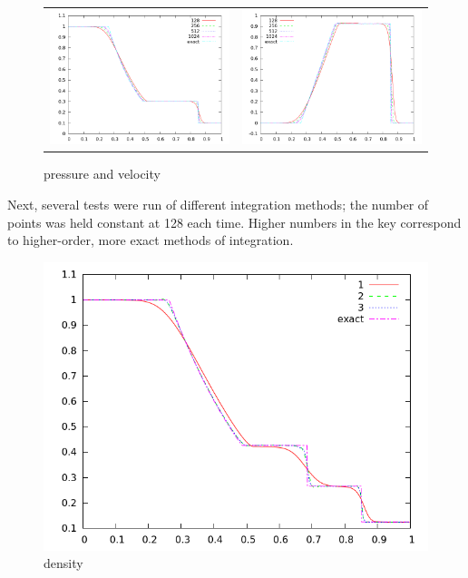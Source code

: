 \documentclass[letterpaper,12pt]{article}
\begin{document}
\begin{figure}
  \begin{center}
	\begin{tabular}{cc}
      \includegraphics[width=.425\textwidth]{prscellcomp_20} &
	  \includegraphics[width=.425\textwidth]{velcellcomp_20}
	\end{tabular}
  \end{center}
  \caption{pressure and velocity}
\end{figure}

    
Next, several tests were run of different integration methods; the number of points was held constant at 128 each time. Higher numbers in the key correspond to higher-order, more exact methods of integration. 

\begin{figure}[h]
  \begin{center}
    \includegraphics[width=.78\textwidth]{den128comp_20}
  \end{center}
  \caption{density}
\end{figure}
\end{document}
